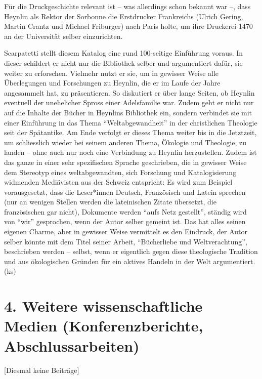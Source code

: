 \documentclass[a4paper,
fontsize=11pt,
oneside,
numbers=noperiodatend,
parskip=half-,
bibliography=totoc,
final
]{scrartcl}
\begin{document}
Für die Druckgeschichte relevant ist -- was allerdings schon bekannt war
--, dass Heynlin als Rektor der Sorbonne die Erstdrucker Frankreichs
(Ulrich Gering, Martin Crantz und Michael Friburger) nach Paris holte,
um ihre Druckerei 1470 an der Universität selber einzurichten.

Scarpatetti stellt diesem Katalog eine rund 100-seitige Einführung
voraus. In dieser schildert er nicht nur die Bibliothek selber und
argumentiert dafür, sie weiter zu erforschen. Vielmehr nutzt er sie, um
in gewisser Weise alle Überlegungen und Forschungen zu Heynlin, die er
im Laufe der Jahre angesammelt hat, zu präsentieren. So diskutiert er
über lange Seiten, ob Heynlin eventuell der unehelicher Spross einer
Adelsfamilie war. Zudem geht er nicht nur auf die Inhalte der Bücher in
Heynlins Bibliothek ein, sondern verbindet sie mit einer Einführung in
das Thema \enquote{Weltabgewandheit} in der christlichen Theologie seit
der Spätantike. Am Ende verfolgt er dieses Thema weiter bis in die
Jetztzeit, um schliesslich wieder bei seinem anderen Thema, Ökologie und
Theologie, zu landen -- ohne auch nur noch eine Verbindung zu Heynlin
herzustellen. Zudem ist das ganze in einer sehr spezifischen Sprache
geschrieben, die in gewisser Weise dem Stereotyp eines weltabgewandten,
sich Forschung und Katalogisierung widmenden Mediävisten aus der Schweiz
entspricht: Es wird zum Beispiel vorausgesetzt, dass die Leser*innen
Deutsch, Französisch und Latein sprechen (nur an wenigen Stellen werden
die lateinischen Zitate übersetzt, die französischen gar nicht),
Dokumente werden \enquote{aufs Netz gestellt}, ständig wird von
\enquote{wir} gesprochen, wenn der Autor selber gemeint ist. Das hat
alles seinen eigenen Charme, aber in gewisser Weise vermittelt es den
Eindruck, der Autor selber könnte mit dem Titel seiner Arbeit,
\enquote{Bücherliebe und Weltverachtung}, beschrieben werden -- selbst,
wenn er eigentlich gegen diese theologische Tradition und aus
ökologischen Gründen für ein aktives Handeln in der Welt argumentiert.
(ks)

\hypertarget{weitere-wissenschaftliche-medien-konferenzberichte-abschlussarbeiten}{%
\section{4. Weitere wissenschaftliche Medien (Konferenzberichte,
Abschlussarbeiten)}\label{weitere-wissenschaftliche-medien-konferenzberichte-abschlussarbeiten}}

{[}Diesmal keine Beiträge{]}
\end{document}
